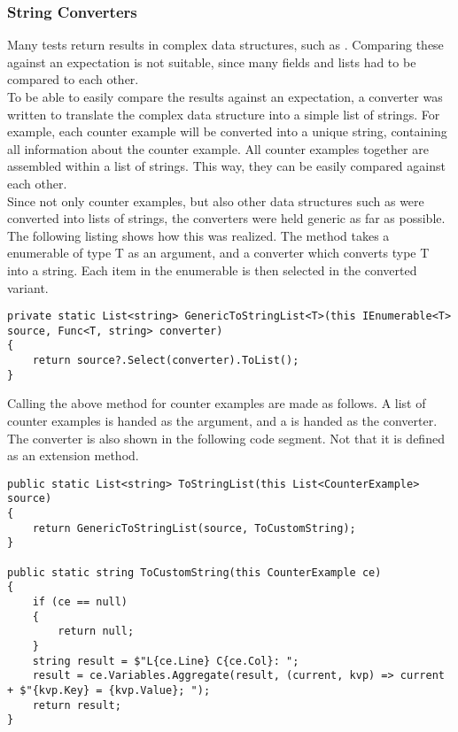 \subsubsection{String Converters}
Many tests return results in complex data structures, such as . Comparing these against an expectation is not suitable, since many fields and lists had to be compared to each other.\\
To be able to easily compare the results against an expectation, a converter was written to translate the complex data structure into a simple list of strings. For example, each counter example will be converted into a unique string, containing all information about the counter example. All counter examples together are assembled within a list of strings. This way, they can be easily compared against each other.\\
Since not only counter examples, but also other data structures such as  were converted into lists of strings, the converters were held generic as far as possible. The following listing shows how this was realized. The method takes a enumerable of type T as an argument, and a converter which converts type T into a string. Each item in the enumerable is then selected in the converted variant.

\begin{lstlisting}[caption={Generic Method to Convert an IEnumerable}, captionpos=b, label={lst:fileRef}]
private static List<string> GenericToStringList<T>(this IEnumerable<T> source, Func<T, string> converter)
{
    return source?.Select(converter).ToList();
}
\end{lstlisting}

Calling the above method for counter examples are made as follows. A list of counter examples is handed as the argument, and a  is handed as the converter. The converter is also shown in the following code segment. Not that it is defined as an extension method.

\begin{lstlisting}[caption={Converting CounterExamples to strings}, captionpos=b, label={lst:fileRef}]
public static List<string> ToStringList(this List<CounterExample> source)
{
    return GenericToStringList(source, ToCustomString);
}

public static string ToCustomString(this CounterExample ce)
{
    if (ce == null)
    {
        return null;
    }
    string result = $"L{ce.Line} C{ce.Col}: ";
    result = ce.Variables.Aggregate(result, (current, kvp) => current + $"{kvp.Key} = {kvp.Value}; ");
    return result;
}
\end{lstlisting}

